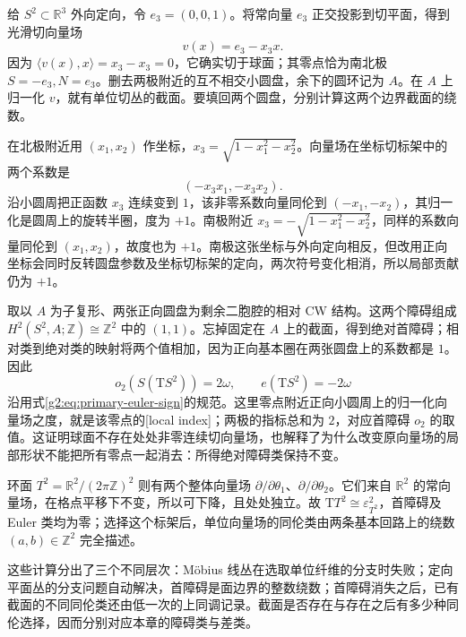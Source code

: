\begin{example}\label{g2:exm:tangent-sphere-torus-obstruction}
	给 \(S^2\subset\mathbb R^3\) 外向定向，令 \(e_3=(0,0,1)\)。将常向量 \(e_3\) 正交投影到切平面，得到光滑切向量场
	\[
		v(x)=e_3-x_3x.
	\]
	因为 \(\langle v(x),x\rangle=x_3-x_3=0\)，它确实切于球面；其零点恰为南北极 \(S=-e_3,N=e_3\)。删去两极附近的互不相交小圆盘，余下的圆环记为 \(A\)。在 \(A\) 上归一化 \(v\)，就有单位切丛的截面。要填回两个圆盘，分别计算这两个边界截面的绕数。

	在北极附近用 \((x_1,x_2)\) 作坐标，\(x_3=\sqrt{1-x_1^2-x_2^2}\)。向量场在坐标切标架中的两个系数是
	\[
		(-x_3x_1,-x_3x_2).
	\]
	沿小圆周把正函数 \(x_3\) 连续变到 \(1\)，该非零系数向量同伦到 \((-x_1,-x_2)\)，其归一化是圆周上的旋转半圈，度为 \(+1\)。南极附近 \(x_3=-\sqrt{1-x_1^2-x_2^2}\)，同样的系数向量同伦到 \((x_1,x_2)\)，故度也为 \(+1\)。南极这张坐标与外向定向相反，但改用正向坐标会同时反转圆盘参数及坐标切标架的定向，两次符号变化相消，所以局部贡献仍为 \(+1\)。

	取以 \(A\) 为子复形、两张正向圆盘为剩余二胞腔的相对 CW 结构。这两个障碍组成 \(H^2(S^2,A;\mathbb Z)\cong\mathbb Z^2\) 中的 \((1,1)\)。忘掉固定在 \(A\) 上的截面，得到绝对首障碍；相对类到绝对类的映射将两个值相加，因为正向基本圈在两张圆盘上的系数都是 \(1\)。因此
	\[
		o_2(S(\mathrm TS^2))=2\omega,\qquad e(\mathrm TS^2)=-2\omega
	\]
	沿用式\eqref{g2:eq:primary-euler-sign}的规范。这里零点附近正向小圆周上的归一化向量场之度，就是该零点的[local index]；两极的指标总和为 \(2\)，对应首障碍 \(o_2\) 的取值。这证明球面不存在处处非零连续切向量场，也解释了为什么改变原向量场的局部形状不能把所有零点一起消去：所得绝对障碍类保持不变。

	环面 \(T^2=\mathbb R^2/(2\pi\mathbb Z)^2\) 则有两个整体向量场 \(\partial/\partial\theta_1\)、\(\partial/\partial\theta_2\)。它们来自 \(\mathbb R^2\) 的常向量场，在格点平移下不变，所以可下降，且处处独立。故 \(\mathrm TT^2\cong\varepsilon_{T^2}^2\)，首障碍及 Euler 类均为零；选择这个标架后，单位向量场的同伦类由两条基本回路上的绕数 \((a,b)\in\mathbb Z^2\) 完全描述。
\end{example}

这些计算分出了三个不同层次：Möbius 线丛在选取单位纤维的分支时失败；定向平面丛的分支问题自动解决，首障碍是面边界的整数绕数；首障碍消失之后，已有截面的不同同伦类还由低一次的上同调记录。截面是否存在与存在之后有多少种同伦选择，因而分别对应本章的障碍类与差类。
